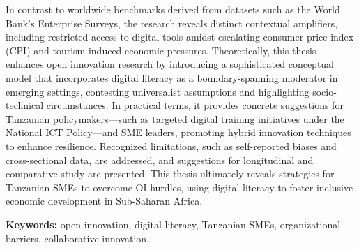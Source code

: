 \medskip

\noindent In contrast to worldwide benchmarks derived from datasets such as the World Bank's Enterprise Surveys, the research reveals distinct contextual amplifiers, including restricted access to digital tools amidst escalating consumer price index (CPI) and tourism-induced economic pressures. Theoretically, this thesis enhances open innovation research by introducing a sophisticated conceptual model that incorporates digital literacy as a boundary-spanning moderator in emerging settings, contesting universalist assumptions and highlighting socio-technical circumstances. In practical terms, it provides concrete suggestions for Tanzanian policymakers—such as targeted digital training initiatives under the National ICT Policy—and SME leaders, promoting hybrid innovation techniques to enhance resilience. Recognized limitations, such as self-reported biases and cross-sectional data, are addressed, and suggestions for longitudinal and comparative study are presented. This thesis ultimately reveals strategies for Tanzanian SMEs to overcome OI hurdles, using digital literacy to foster inclusive economic development in Sub-Saharan Africa.

\medskip

\noindent \textbf{Keywords:} open innovation, digital literacy, Tanzanian SMEs, organizational barriers, collaborative innovation.
